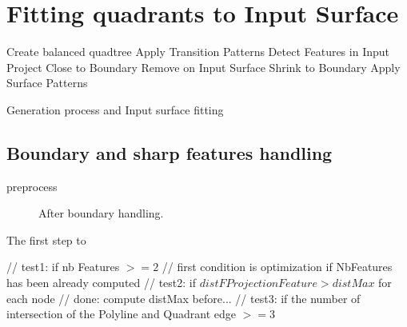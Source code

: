 \documentclass[10pt]{article}
\begin{document}
\section{Fitting quadrants to Input Surface}
\label{sec:method}



\begin{algorithm}[H]

\SetAlgoLined
{}
\nl {}
 \nl Create balanced quadtree\; \label{alg:goto}
 \nl Apply Transition Patterns\;
 \nl Detect Features in Input\;
 Project Close to Boundary\;
 Remove on Input Surface\;
 Shrink to Boundary\;
 \nl Apply Surface Patterns\;
 \caption{Generation process and Input surface fitting}
 \label{alg:surfacefitting}
\end{algorithm}

\subsection{Boundary and sharp features handling}

preprocess

 \begin{figure}[htb]
\centering
\caption{After boundary handling.}
\label{fig:boundary}
\end{figure}

The first step to 

        // test1: if nb Features $>= 2$
        // first condition is optimization if NbFeatures has been already computed
        // test2: if $distFProjectionFeature > distMax$ for each node
        // done: compute distMax before...
        // test3: if the number of intersection of the Polyline and Quadrant edge $>= 3$
\end{document}
